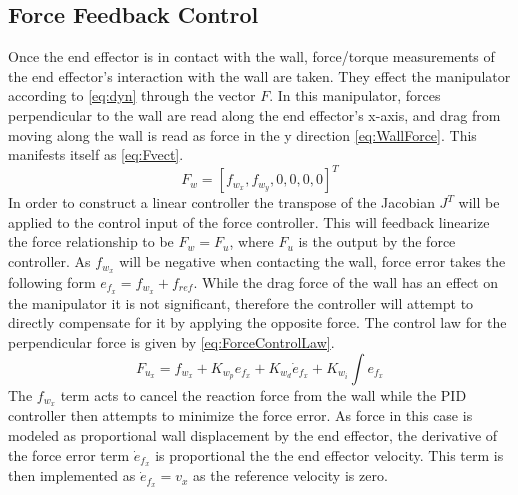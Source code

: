 \documentclass[letterpaper,12pt]{report}
\begin{document}
\subsection{Force Feedback Control}
Once the end effector is in contact with the wall, force/torque measurements of the end effector's interaction with the wall are taken. They
effect the manipulator according to \eqref{eq:dyn} through the vector $F$. In this manipulator, forces perpendicular to the wall are read
along the end effector's x-axis, and drag from moving along the wall is read as force in the y direction \eqref{eq:WallForce}. 
This manifests itself as \eqref{eq:Fvect}.
\begin{equation} \label{eq:Fvect}
F_w = [f_{w_x},f_{w_y},0,0,0,0]^T
\end{equation}
In order to construct a linear controller the transpose of the Jacobian $J^T$ will be applied to the control input of the force controller.
This will feedback linearize the force relationship to be $F_w = F_u$, where $F_u$ is the output by the force controller.
As $f_{w_x}$ will be negative when contacting the wall, force error takes the following form $e_{f_x}= f_{w_x} + f_{ref}$.
While the drag force of the wall has an effect on the manipulator it is not significant, therefore the controller will attempt
to directly compensate for it by applying the opposite force. The control law for the perpendicular force is given by \eqref{eq:ForceControlLaw}.
\begin{equation} \label{eq:ForceControlLaw}
F_{u_x} = f_{w_x} + K_{w_p}e_{f_x} + K_{w_d}\dot e_{f_x} + K_{w_i}\int e_{f_x}
\end{equation}
The $f_{w_x}$ term acts to cancel the reaction force from the wall while the PID controller then attempts to minimize the force error.
As force in this case is modeled as proportional wall displacement by the end effector, the derivative of the force error term $\dot e_{f_x}$
is proportional the the end effector velocity. This term is then implemented as $\dot e_{f_x} = v_x$ as the reference velocity is zero.
\end{document}
